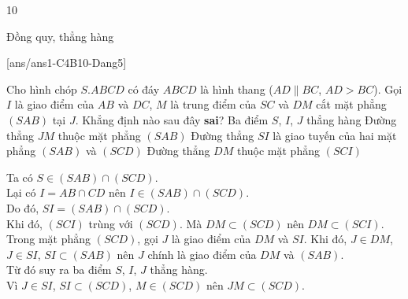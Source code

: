 \begin{indapan}{10}
\begin{dang}{Đồng quy, thẳng hàng}
\end{dang}
[ans/ans1-C4B10-Dang5]
\begin{ex}%
Cho hình chóp $S.ABCD$ có đáy $ABCD$ là hình thang ($AD\parallel BC$, $AD>BC$). Gọi $I$ là giao điểm của $AB$ và $DC$, $M$ là trung điểm của $SC$ và $DM$ cắt mặt phẳng $(SAB)$ tại $J$. Khẳng định nào sau đây \textbf{sai}?
\choice
{Ba điểm $S$, $I$, $J$ thẳng hàng}
{\True Đường thẳng $JM$ thuộc mặt phẳng $(SAB)$}
{Đường thẳng $SI$ là giao tuyến của hai mặt phẳng $(SAB)$ và $(SCD)$}
{Đường thẳng $DM$ thuộc mặt phẳng $(SCI)$}
\loigiai
{
\immini
{
Ta có $S\in (SAB)\cap (SCD)$.\\
Lại có $I=AB\cap CD$ nên $I\in (SAB)\cap (SCD)$.\\
Do đó, $SI=(SAB)\cap (SCD)$.\\
Khi đó, $(SCI)$ trùng với $(SCD)$. Mà $DM\subset (SCD)$ nên $DM\subset (SCI)$.\\
Trong mặt phẳng $(SCD)$, gọi $J$ là giao điểm của $DM$ và $SI$. Khi đó, $J\in DM$, $J\in SI$, $SI\subset (SAB)$ nên $J$ chính là giao điểm của $DM$ và $(SAB)$.\\
Từ đó suy ra ba điểm $S$, $I$, $J$ thẳng hàng.\\
Vì $J\in SI$, $SI\subset (SCD)$, $M\in (SCD)$ nên $JM\subset (SCD)$.
}
{
}
}
\end{ex}


\end{indapan}
